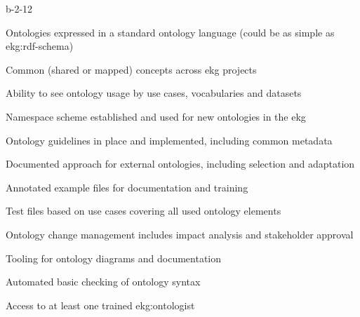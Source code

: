 \begin{level-assessment}{b-2-1}{2}

    \item Ontologies expressed in a standard ontology language (could be as simple as \gls{ekg:rdf-schema})
    \item Common (shared or mapped) concepts across \gls{ekg} projects
    \item Ability to see ontology usage by use cases, vocabularies and datasets
    \item Namespace scheme established and used for new ontologies in the \gls{ekg}
    \item Ontology guidelines in place and implemented, including common metadata
    \item Documented approach for external ontologies, including selection and adaptation
    \item Annotated example files for documentation and training
    \item Test files based on use cases covering all used ontology elements
    \item Ontology change management includes impact analysis and stakeholder approval
    \item Tooling for ontology diagrams and documentation
    \item Automated basic checking of ontology syntax
    \item Access to at least one trained \gls{ekg:ontologist}

\end{level-assessment}

